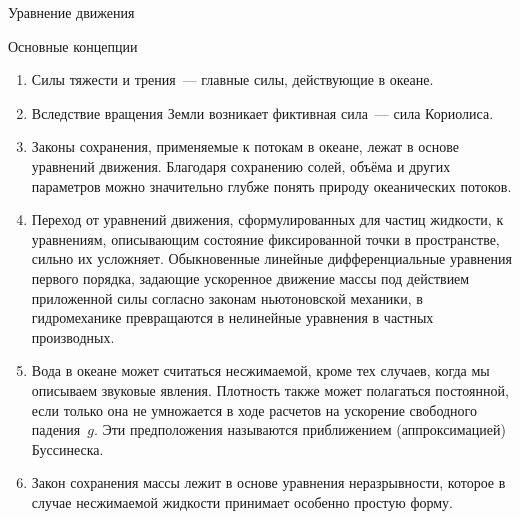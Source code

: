 \begin{chapter}{Уравнение движения}
\begin{section}{Основные концепции}
\begin{enumerate}
\item
Силы тяжести и трения~--- главные силы, действующие в океане.
%

\item
Вследствие вращения Земли возникает фиктивная сила~--- сила Кориолиса.
%

\item
Законы сохранения, применяемые к потокам в океане, лежат в основе уравнений
движения. Благодаря сохранению солей, объёма и других параметров можно 
значительно глубже понять природу океанических потоков.
%

\item
Переход от уравнений движения, сформулированных для частиц жидкости, 
к уравнениям, описывающим состояние фиксированной точки в пространстве, сильно
их усложняет. Обыкновенные линейные дифференциальные уравнения первого порядка, 
задающие ускоренное движение массы под действием приложенной силы согласно 
законам ньютоновской механики, в гидромеханике превращаются в нелинейные 
уравнения в частных производных.
%

\item
Вода в океане может считаться несжимаемой, кроме тех случаев, когда мы
описываем звуковые явления. Плотность также может полагаться постоянной, 
если только она не умножается в ходе расчетов на ускорение свободного 
падения~$g$. Эти предположения называются приближением (аппроксимацией) 
Буссинеска.
%

\item
Закон сохранения массы лежит в основе уравнения неразрывности, которое 
в случае несжимаемой жидкости принимает особенно простую форму.
%
\end{enumerate}
\end{section}
\end{chapter}
